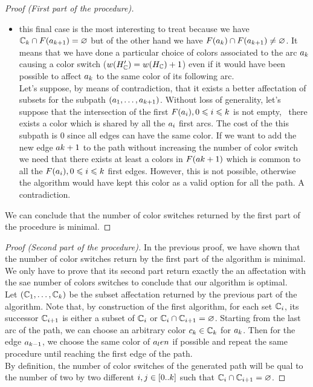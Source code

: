 \begin{proof}[Proof (First part of the procedure)]
\begin{itemize}
\begin{itemize}
            \item this final case is the most interesting to treat because we have $\mathbb{C}_{k} \cap F(a_{k+1}) = \varnothing$ but of the other hand we have $F(a_{k}) \cap F(a_{k+1}) \neq \varnothing$. It means that we have done a particular choice of colors associated to the arc $a_k$ causing a color switch ($w(H_{\mathbb{C}}') = w(H_{\mathbb{C}}) + 1$) even if it would have been possible to affect $a_k$ to the same color of its following arc.\\
                  Let's suppose, by means of contradiction, that it exists a better affectation of subsets for the subpath $(a_1,\ldots,a_{k + 1})$. Without loss of generality, let's suppose that the intersection of the first $F(a_i), 0 \leqslant i \leqslant k$ is not empty, \ie\ there exists a color which is shared by all the $a_i$ first arcs. The cost of the this subpath is $0$ since all edges can have the same color. If we want to add the new edge $a{k + 1}$ to the path without increasing the number of color switch we need that there exists at least a colors in $F(a{k + 1})$ which is common to all the $F(a_i), 0 \leqslant i \leqslant k$ first edges. However, this is not possible, otherwise the algorithm would have kept this color as a valid option for all the path. A contradiction.
          \end{itemize}
  \end{itemize}
  We can conclude that the number of color switches returned by the first part of the procedure is minimal.
\end{proof}

\begin{proof}[Proof (Second part of the procedure)]
  In the previous proof, we have shown that the number of color switches return by the first part of the algorithm is minimal. We only have to prove that its second part return exactly the an affectation with the sae number of colors switches to conclude that our algorithm is optimal.\\
  Let $(\mathbb{C}_1,\ldots,\mathbb{C}_{k})$ be the subset affectation returned by the previous part of the algorithm. Note that, by construction of the first algorithm, for each set $\mathbb{C}_i$, its successor $\mathbb{C}_{i+1}$ is either a subset of $\mathbb{C}_i$ or $\mathbb{C}_i \cap \mathbb{C}_{i+1} = \varnothing$.
  Starting from the last arc of the path, we can choose an arbitrary color $c_k \in \mathbb{C}_k$ for $a_k$. Then for the edge $a_{k-1}$, we choose the same color of $a_len$ if possible and repeat the same procedure until reaching the first edge of the path.\\
  By definition, the number of color switches of the generated path will be qual to the number of two by two different $i, j \in [0..k]$ such that $\mathbb{C}_i \cap \mathbb{C}_{i+1} = \varnothing$.
\end{proof}

